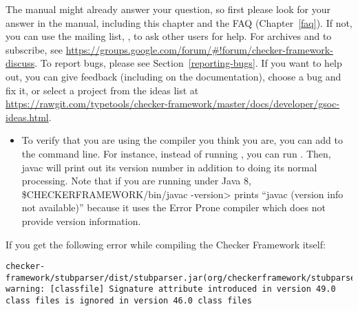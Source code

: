 \htmlhr
{}

\begin{sloppypar}
The manual might already answer your question, so first please look for
your answer in the manual,
including this chapter and the FAQ (Chapter~\ref{faq}).
If not, you can use the mailing list,
, to ask other users for
help.  For archives and to subscribe, see \url{https://groups.google.com/forum/#!forum/checker-framework-discuss}.
To report bugs, please see Section~\ref{reporting-bugs}.
If you want to help out, you can give feedback (including on the
documentation), choose a bug and fix it, or select a
project from the ideas list at
\url{https://rawgit.com/typetools/checker-framework/master/docs/developer/gsoc-ideas.html}.
\end{sloppypar}



\begin{itemize}
\item
To verify that you are using the compiler you think you are, you can add
 to the command line.  For instance, instead of running
, you can run .  Then, javac will print out its version number in addition
to doing its normal processing.  Note that if you are running under Java 8,
\<\$CHECKERFRAMEWORK/bin/javac -version> prints ``javac (version info
not available)'' because it uses the Error Prone compiler which does not
provide version information.

\end{itemize}



If you get the following error while compiling the Checker Framework itself:

\begin{smaller}
\begin{Verbatim}
checker-framework/stubparser/dist/stubparser.jar(org/checkerframework/stubparser/ast/CompilationUnit.class):
warning: [classfile] Signature attribute introduced in version 49.0 class files is ignored in version 46.0 class files
\end{Verbatim}
\end{smaller}


